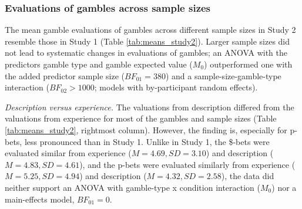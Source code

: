 \documentclass[a4paper, man, floatsintext]{apa6}
\title{}
\author{Jana B. Jarecki}
\date{27 November, 2019}
\begin{document}
\subsubsection{Evaluations of gambles across sample sizes}

The mean gamble evaluations of gambles across different sample sizes in
Study 2 resemble those in Study 1 (Table \ref{tab:means_study2}). Larger
sample sizes did not lead to systematic changes in evaluations of
gambles; an ANOVA with the predictors gamble type and gamble expected
value (\(M_0\)) outperformed one with the added predictor sample size
(\(BF_{01} = 380\)) and a sample-size-gamble-type interaction
(\(BF_{02} > 1000\); models with by-participant random effects).

\textit{Description versus experience.} The valuations from description
differed from the valuations from experience for most of the gambles and
sample sizes (Table \ref{tab:means_study2}, rightmost column). However,
the finding is, especially for p-bets, less pronounced than in Study 1.
Unlike in Study 1, the \$-bets were evaluated similar from experience
(\(M=4.69, SD=3.10\)) and description (\(M=4.83, SD=4.61\)), and the
p-bets were evaluated similarly from experience (\(M=5.25, SD=4.94\))
and description (\(M=4.32, SD=2.58\)), the data did neither support an
ANOVA with gamble-type x condition interaction (\(M_0\)) nor a
main-effects model, \(BF_{01} = 0\).
\end{document}
